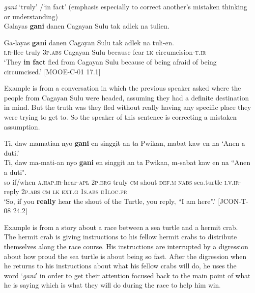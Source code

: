 \ea
\label{bkm:Ref113434139}
\textit{gani} ‘truly’ /`in fact' (emphasis especially to correct another’s mistaken thinking or understanding) \\
Galayas  \textbf{gani}  danen  Cagayan Sulu  tak  adlek  na  tulien. \\\smallskip

\gll Ga-layas  \textbf{gani}  danen  Cagayan Sulu  tak  adlek  na  tuli-en. \\
\textsc{i.r}-flee  truly  3\textsc{p.abs}  Cagayan Sulu  because  fear  \textsc{lk}  circumcision-\textsc{t.ir} \\
\glt ‘They \textbf{in fact} fled from Cagayan Sulu because of being afraid of being circumcised.’ [MOOE-C-01 17.1]
\z

Example  is from a conversation in which the previous speaker asked where the people from Cagayan Sulu were headed, assuming they had a definite destination in mind. But the truth was they fled without really having any specific place they were trying to get to. So the speaker of this sentence is correcting a mistaken assumption.


\ea
\label{bkm:Ref113434330}
Ti,  daw  mamatian  nyo    \textbf{gani}  en  singgit  an  ta Pwikan, mabat  kaw  en  na  ‘Anen  a  duti.’ \\\smallskip
 \gll Ti,  daw  ma-mati-an  nyo    \textbf{gani}  en  singgit  an  ta Pwikan, m-sabat  kaw  en  na  ``Anen  a  duti". \\
        so  if/when  \textsc{a.hap.ir}-hear-\textsc{apl}  2\textsc{p.erg}  truly  \textsc{cm}  shout  \textsc{def.m}  \textsc{nabs}      sea.turtle \textsc{i.v.ir}-reply  2\textsc{p.abs}  \textsc{cm}  \textsc{lk}  \textsc{ext.g}  1\textsc{s.abs}  \textsc{d}1\textsc{loc.pr} \\
    \glt `So, if you \textbf{really} hear the shout of the Turtle, you reply, “I am here”.' [JCON-T-08 24.2]
\z

Example  is from a story about a race between a sea turtle and a hermit crab. The hermit crab is giving instructions to his fellow hermit crabs to distribute themselves along the race course. His instructions are interrupted by a digression about how proud the sea turtle is about being so fast. After the digression when he returns to his instructions about what his fellow crabs will do, he uses the word ‘\textit{gani}’ in order to get their attention focused back to the main point of what he is saying which is what they will do during the race to help him win.

